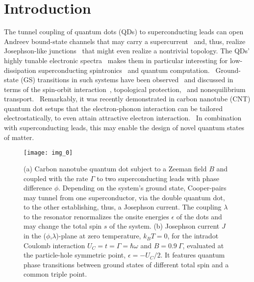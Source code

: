 \documentclass[aps,prb,twocolumn,superscriptaddress,amsmath,amssymb,longbibliography]{revtex4-1}
\begin{document}
	\section{Introduction}
	The tunnel coupling of quantum dots (QDs) to superconducting leads can open Andreev bound-state channels that may carry a 
	supercurrent~\cite{PilletNatPhys2010a,LeeNatNano2014a,HwangPRB2015a,HwangEPJB2017a} and, thus, realize Josephson-like 
	junctions~\cite{ChoiPRB2000a,KarraschPRB2008a,MengPRB2009a,DeFranceschiNatNano2010a,Martin-RoderoAP2011a,WentzellPRB2016a} 
	that might even realize a nontrivial topology. \cite{RiwarNC2016a,KleesPRL2020a,MeyerArXiv2019a,WeisbrichPRXQuantum2021a}
	The QDs' highly tunable electronic spectra~\cite{CiorgaPRB2000a,Tarucha2001a,WielRMP2002a,BiercukNanoL2005a} makes them in 
	particular interesting for low-dissipation superconducting spintronics~\cite{EschrigRPP2015a,LinderNatPhys2015a} and quantum 
	computation.~\cite{LaddNature2010a,AruteNature2019a} Ground-state (GS) transitions in such systems have been 
	observed~\cite{DamNature2006a,DelagrangePRB2016a,DelagrangePhysicaB2018a,EstradaSaldanaPRL2018a} and discussed in terms of 
	the spin-orbit interaction~\cite{LimPRL2011a,DrosteJP2012a}, topological 
	protection,~\cite{MarraPRB2016a,TiiraNatureC2017a,MarraBeilsteinJN2018a,ArracheaPRB2019a,BlasiPRB2019a} and nonequilibrium 
	transport.~\cite{PalaNJP2007a,GovernalePRB2008a,FuttererPRB2013a,OguriPRB2013a} Remarkably, it was recently demonstrated 
	in carbon nanotube (CNT) quantum dot setups that the electron-phonon interaction can be tailored electrostatically, to even 
	attain attractive electron interaction.~\cite{KuemmethNature2008a,BenyaminiNP2014a,HamoNature2016a} In combination with 
	superconducting leads, this may enable the design of novel quantum states of matter.~\cite{MarganskaPRL2019a,BlienNC2020a}
	\begin{figure}[b!]
		\texttt{[image: img\_0]}\caption{\label{fig.:scheme}(a) Carbon nanotube quantum dot subject to a Zeeman field $B$ and coupled with the rate $\Gamma$ to two 
		superconducting leads with phase difference $\phi$. Depending on the system's ground state, Cooper-pairs may tunnel from one superconductor, 
		via the double quantum dot, to the other establishing, thus, a Josephson current. The coupling $\lambda$ to the resonator renormalizes the onsite 
		energies $\epsilon$ of the dots and may change the total spin $s$ of the system.
		(b) Josephson current $J$ in the ($\phi$,$\lambda$)-plane at zero temperature, $k_B T=0$, for the intradot Coulomb interaction 
		$U_C=t=\Gamma=\hbar\omega$ and $B=0.9\:\Gamma$, evaluated at the particle-hole symmetric point,
		$\epsilon=-U_C/2$. It features quantum phase transitions between ground states of different total spin and a common triple point. 
		}
	\end{figure}
\end{document}
